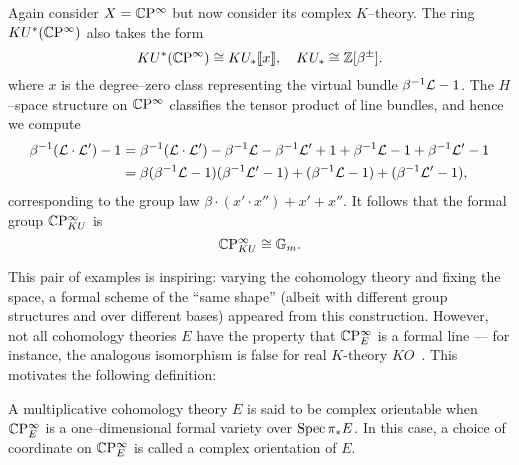 \begin{example}
Again consider $X = \mathbb{C}\mathrm P^\infty$ but now consider its complex $K$--theory.  The ring $KU^*(\mathbb{C}\mathrm P^\infty)$ also takes the form \[KU^*(\mathbb{C}\mathrm P^\infty) \cong KU_*\llbracket x \rrbracket, \quad KU_* \cong \mathbb Z[\beta^\pm].\] where $x$ is the degree--zero class representing the virtual bundle $\beta^{-1} \mathcal{L} - 1$.  The $H$--space structure on $\mathbb{C}\mathrm P^\infty$ classifies the tensor product of line bundles, and hence we compute
\begin{align*}
\beta^{-1} (\mathcal{L} \cdot \mathcal{L}') - 1 & = \beta^{-1} (\mathcal{L} \cdot \mathcal{L}') - \beta^{-1} \mathcal{L} - \beta^{-1} \mathcal{L}' + 1 + \beta^{-1} \mathcal{L} - 1 + \beta^{-1} \mathcal{L}' - 1 \\
& = \beta (\beta^{-1} \mathcal{L} - 1)(\beta^{-1} \mathcal{L}' - 1) + (\beta^{-1} \mathcal{L} - 1) + (\beta^{-1} \mathcal{L}' - 1),
\end{align*}
corresponding to the group law $\beta \cdot (x' \cdot x'') + x' + x''$.  It follows that the formal group $\mathbb{C}\mathrm P^\infty_{KU}$ is \[\mathbb{C}\mathrm P^\infty_{KU} \cong \mathbb G_m.\]
\end{example}

This pair of examples is inspiring: varying the cohomology theory and fixing the space, a formal scheme of the ``same shape'' (albeit with different group structures and over different bases) appeared from this construction.  However, not all cohomology theories $E$ have the property that $\mathbb{C}\mathrm P^\infty_E$ is a formal line --- for instance, the analogous isomorphism is false for real $K$-theory $KO$~\cite[Corollary 2.13]{Yamaguchi}.  This motivates the following definition:

\begin{definition}
A multiplicative cohomology theory $E$ is said to be complex orientable when $\mathbb{C}\mathrm P^\infty_E$ is a one--dimensional formal variety over $\operatorname{Spec} \pi_* E$.  In this case, a choice of coordinate on $\mathbb{C}\mathrm P^\infty_E$ is called a complex orientation of $E$.
\end{definition}

